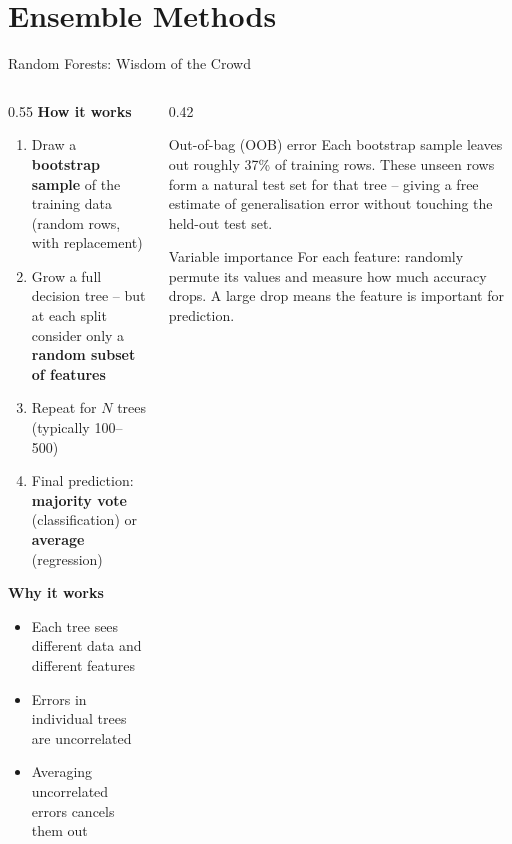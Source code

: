 \documentclass[aspectratio=169, 10pt]{beamer}
\begin{document}
\section{Ensemble Methods}

\begin{frame}{Random Forests: Wisdom of the Crowd}
\begin{columns}[T]
\begin{column}{0.55\textwidth}
\textbf{How it works}
\begin{enumerate}
  \setlength\itemsep{0.35em}
  \item Draw a \textbf{bootstrap sample} of the training data (random rows, with replacement)
  \item Grow a full decision tree -- but at each split consider only a \textbf{random subset of features}
  \item Repeat for $N$ trees (typically 100--500)
  \item Final prediction: \textbf{majority vote} (classification) or \textbf{average} (regression)
\end{enumerate}

\vspace{0.6em}
\textbf{Why it works}
\begin{itemize}
  \item Each tree sees different data and different features
  \item Errors in individual trees are uncorrelated
  \item Averaging uncorrelated errors cancels them out
\end{itemize}
\end{column}
\begin{column}{0.42\textwidth}
\begin{block}{Out-of-bag (OOB) error}
Each bootstrap sample leaves out roughly 37\% of training rows. These unseen rows form a natural test set for that tree -- giving a free estimate of generalisation error without touching the held-out test set.
\end{block}

\vspace{0.6em}
\begin{block}{Variable importance}
For each feature: randomly permute its values and measure how much accuracy drops. A large drop means the feature is important for prediction.
\end{block}
\end{column}
\end{columns}
\end{frame}
\end{document}
